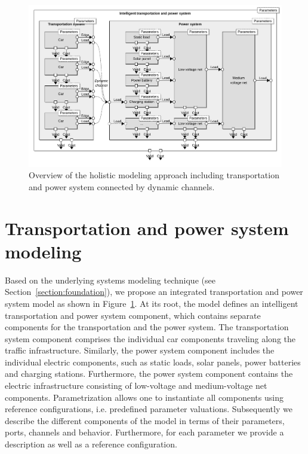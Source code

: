 \begin{figure}[b]
	\centering
	\includegraphics[width=\textwidth]{../gfx/model.pdf}
	\caption{Overview of the holistic modeling approach including transportation and power system connected by dynamic channels.}
	\label{fig:model}
\end{figure}

\section{Transportation and power system modeling}
\label{section:contribution}

Based on the underlying systems modeling technique (see Section~\ref{section:foundation}), we propose an integrated transportation and power system model as shown in Figure~\ref{fig:model}. At its root, the model defines an intelligent transportation and power system component, which contains separate components for the transportation and the power system. The transportation system component comprises the individual car components traveling along the traffic infrastructure. Similarly, the power system component includes the individual electric components, such as static loads, solar panels, power batteries and charging stations. Furthermore, the power system component contains the electric infrastructure consisting of low-voltage and medium-voltage net components. Parametrization allows one to instantiate all components using reference configurations, i.e. predefined parameter valuations. Subsequently we describe the different components of the model in terms of their parameters, ports, channels and behavior. Furthermore, for each parameter we provide a description as well as a reference configuration.

